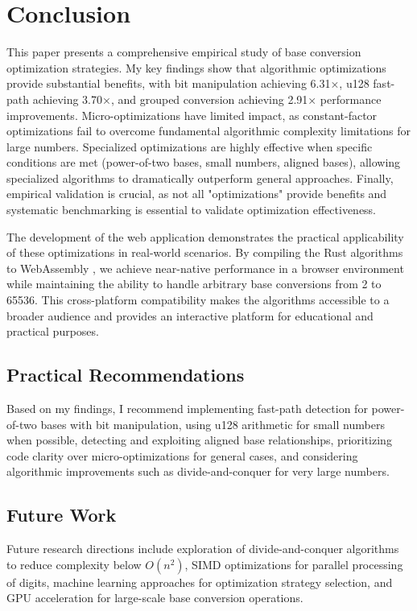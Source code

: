 \documentclass[10pt]{article}
\begin{document}
\section{Conclusion}

This paper presents a comprehensive empirical study of base conversion optimization strategies. My key findings show that algorithmic optimizations provide substantial benefits, with bit manipulation achieving 6.31×, u128 fast-path achieving 3.70×, and grouped conversion achieving 2.91× performance improvements. Micro-optimizations have limited impact, as constant-factor optimizations fail to overcome fundamental algorithmic complexity limitations for large numbers. Specialized optimizations are highly effective when specific conditions are met (power-of-two bases, small numbers, aligned bases), allowing specialized algorithms to dramatically outperform general approaches. Finally, empirical validation is crucial, as not all "optimizations" provide benefits and systematic benchmarking is essential to validate optimization effectiveness.

The development of the web application demonstrates the practical applicability of these optimizations in real-world scenarios. By compiling the Rust algorithms to WebAssembly \cite{webassembly2023}, we achieve near-native performance in a browser environment while maintaining the ability to handle arbitrary base conversions from 2 to 65536. This cross-platform compatibility makes the algorithms accessible to a broader audience and provides an interactive platform for educational and practical purposes.

\subsection{Practical Recommendations}

Based on my findings, I recommend implementing fast-path detection for power-of-two bases with bit manipulation, using u128 arithmetic for small numbers when possible, detecting and exploiting aligned base relationships, prioritizing code clarity over micro-optimizations for general cases, and considering algorithmic improvements such as divide-and-conquer for very large numbers.

\subsection{Future Work}

Future research directions include exploration of divide-and-conquer algorithms to reduce complexity below $O(n^2)$, SIMD optimizations for parallel processing of digits, machine learning approaches for optimization strategy selection, and GPU acceleration for large-scale base conversion operations.



\end{document}

